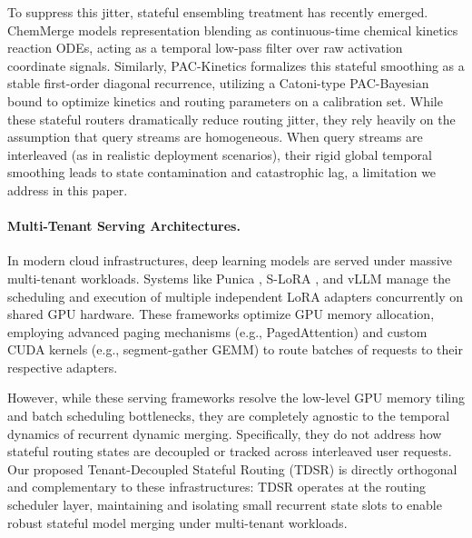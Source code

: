 To suppress this jitter, stateful ensembling treatment has recently emerged. ChemMerge \cite{chemmerge25} models representation blending as continuous-time chemical kinetics reaction ODEs, acting as a temporal low-pass filter over raw activation coordinate signals. Similarly, PAC-Kinetics \cite{pac_zca_2026} formalizes this stateful smoothing as a stable first-order diagonal recurrence, utilizing a Catoni-type PAC-Bayesian bound to optimize kinetics and routing parameters on a calibration set. While these stateful routers dramatically reduce routing jitter, they rely heavily on the assumption that query streams are homogeneous. When query streams are interleaved (as in realistic deployment scenarios), their rigid global temporal smoothing leads to state contamination and catastrophic lag, a limitation we address in this paper.

\paragraph{Multi-Tenant Serving Architectures.}
In modern cloud infrastructures, deep learning models are served under massive multi-tenant workloads. Systems like Punica \cite{chen2023punica}, S-LoRA \cite{s-lora}, and vLLM \cite{kwon2023efficient} manage the scheduling and execution of multiple independent LoRA adapters concurrently on shared GPU hardware. These frameworks optimize GPU memory allocation, employing advanced paging mechanisms (e.g., PagedAttention) and custom CUDA kernels (e.g., segment-gather GEMM) to route batches of requests to their respective adapters.

However, while these serving frameworks resolve the low-level GPU memory tiling and batch scheduling bottlenecks, they are completely agnostic to the temporal dynamics of recurrent dynamic merging. Specifically, they do not address how stateful routing states are decoupled or tracked across interleaved user requests. Our proposed Tenant-Decoupled Stateful Routing (TDSR) is directly orthogonal and complementary to these infrastructures: TDSR operates at the routing scheduler layer, maintaining and isolating small recurrent state slots to enable robust stateful model merging under multi-tenant workloads.
